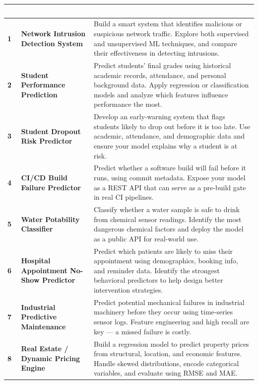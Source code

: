 \documentclass[12pt, a4paper]{article}
\renewcommand{\arraystretch}{1.5}
\begin{document}
\begin{table}[ht]
\centering
\renewcommand{\arraystretch}{1.7}
\begin{tabularx}{\textwidth}{
  >{\centering\bfseries}p{0.6cm}
  >{\bfseries}p{4.5cm}
  >{\raggedright\arraybackslash}X
}
\toprule
\rowcolor{headerblue}
\textcolor{white}{\#} &
\textcolor{white}{Project Title} &
\textcolor{white}{Brief Description} \\
\midrule

1 & Network Intrusion Detection System
  & Build a smart system that identifies malicious or suspicious network traffic. Explore both supervised
    and unsupervised ML techniques, and compare their effectiveness in detecting intrusions. \\
\rowcolor{rowgray}
2 & Student Performance Prediction
  & Predict students' final grades using historical academic records, attendance, and personal background
    data. Apply regression or classification models and analyze which features influence performance
    the most. \\

3 & Student Dropout Risk Predictor
  & Develop an early-warning system that flags students likely to drop out before it is too late. Use
    academic, attendance, and demographic data and ensure your model explains why a student is at risk. \\
\rowcolor{rowgray}
4 & CI/CD Build Failure Predictor
  & Predict whether a software build will fail before it runs, using commit metadata. Expose your model
    as a REST API that can serve as a pre-build gate in real CI pipelines. \\

5 & Water Potability Classifier
  & Classify whether a water sample is safe to drink from chemical sensor readings. Identify the most
    dangerous chemical factors and deploy the model as a public API for real-world use. \\
\rowcolor{rowgray}
6 & Hospital Appointment No-Show Predictor
  & Predict which patients are likely to miss their appointment using demographics, booking info, and
    reminder data. Identify the strongest behavioral predictors to help design better intervention
    strategies. \\

7 & Industrial Predictive Maintenance
  & Predict potential mechanical failures in industrial machinery before they occur using time-series
    sensor logs. Feature engineering and high recall are key --- a missed failure is costly. \\
\rowcolor{rowgray}
8 & Real Estate / Dynamic Pricing Engine
  & Build a regression model to predict property prices from structural, location, and economic features.
    Handle skewed distributions, encode categorical variables, and evaluate using RMSE and MAE. \\


\end{tabularx}
\end{table}
\end{document}
